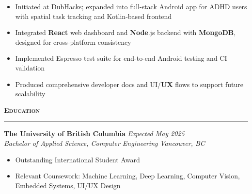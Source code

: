 \documentclass[11pt, letterpaper]{article}
\newcommand{\resumesection}[1]{
  \vspace{8pt} %
  {\large\bfseries\scshape\color{black}#1} %
  \vspace{3pt} %
  \hrule height 0.8pt %
  \vspace{8pt} %
}
\begin{document}
  \vspace{1pt}
  \begin{itemize}\item Initiated at DubHacks; expanded into full-stack Android app for ADHD users with spatial task tracking and Kotlin-based frontend\item Integrated \textbf{React} web dashboard and \textbf{Node}.js backend with \textbf{MongoDB}, designed for cross-platform consistency\item Implemented Espresso test suite for end-to-end Android testing and CI validation\item Produced comprehensive developer docs and UI/\textbf{UX} flows to support future scalability\end{itemize}
\resumesection{Education}
  \textbf{The University of British Columbia} \hfill \textit{Expected May 2025} \\
  \textit{Bachelor of Applied Science, Computer Engineering} \hfill \textit{Vancouver, BC}
  \begin{itemize}[itemsep=1pt]
    \item Outstanding International Student Award
    \item Relevant Coursework: Machine Learning, Deep Learning, Computer Vision, Embedded Systems, UI/UX Design
  \end{itemize}
\end{document}
